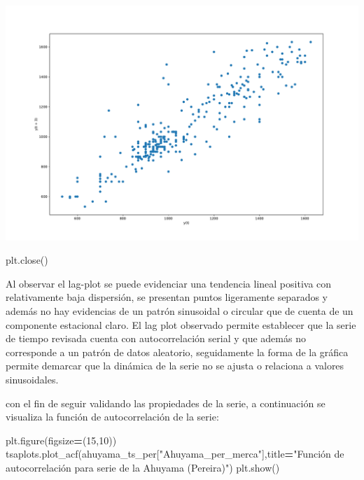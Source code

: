 \documentclass[
]{book}
\newenvironment{Shaded}{\begin{snugshade}}{\end{snugshade}}
\newcommand{\DecValTok}[1]{\textcolor[rgb]{0.00,0.00,0.81}{#1}}
\newcommand{\NormalTok}[1]{#1}
\newcommand{\OperatorTok}[1]{\textcolor[rgb]{0.81,0.36,0.00}{\textbf{#1}}}
\newcommand{\StringTok}[1]{\textcolor[rgb]{0.31,0.60,0.02}{#1}}
\begin{document}
\includegraphics{bookdown-demo_files/figure-latex/unnamed-chunk-86-59.pdf}

\begin{Shaded}
\begin{Highlighting}[]
\NormalTok{plt.close()}
\end{Highlighting}
\end{Shaded}

Al observar el lag-plot se puede evidenciar una tendencia lineal positiva con relativamente baja dispersión, se presentan puntos ligeramente separados y además no hay evidencias de un patrón sinusoidal o circular que de cuenta de un componente estacional claro. El lag plot observado permite establecer que la serie de tiempo revisada cuenta con autocorrelación serial y que además no corresponde a un patrón de datos aleatorio, seguidamente la forma de la gráfica permite demarcar que la dinámica de la serie no se ajusta o relaciona a valores sinusoidales.

con el fin de seguir validando las propiedades de la serie, a continuación se visualiza la función de autocorrelación de la serie:

\begin{Shaded}
\begin{Highlighting}[]

\NormalTok{plt.figure(figsize}\OperatorTok{=}\NormalTok{(}\DecValTok{15}\NormalTok{,}\DecValTok{10}\NormalTok{))}
\NormalTok{tsaplots.plot\_acf(ahuyama\_ts\_per[}\StringTok{"Ahuyama\_per\_merca"}\NormalTok{],title}\OperatorTok{=}\StringTok{"Función de autocorrelación para serie de la Ahuyama (Pereira)"}\NormalTok{)}
\NormalTok{plt.show()}
\end{Highlighting}
\end{Shaded}
\end{document}
